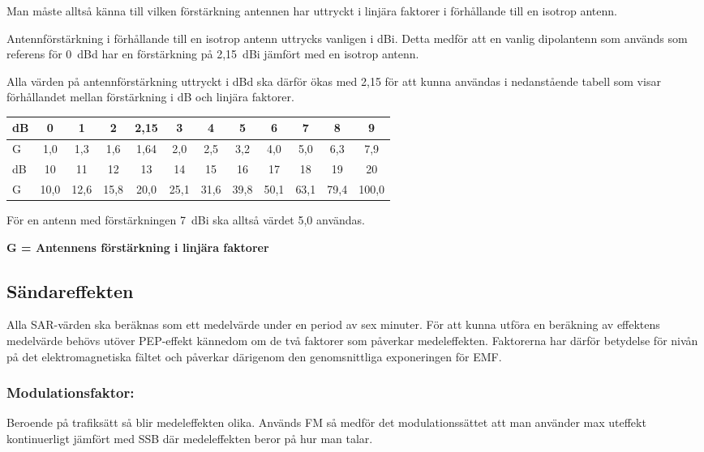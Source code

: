 Man måste alltså känna till vilken förstärkning antennen har uttryckt i linjära
faktorer i förhållande till en isotrop antenn.

Antennförstärkning i förhållande till en isotrop antenn uttrycks vanligen i dBi.
Detta medför att en vanlig dipolantenn som används som referens för 0~dBd har
en förstärkning på 2,15~dBi jämfört med en isotrop antenn.

Alla värden på antennförstärkning uttryckt i dBd ska därför ökas med 2,15 för
att kunna användas i nedanstående tabell som visar förhållandet mellan
förstärkning i dB och linjära faktorer.

\begin{tabular}{|l|ccccccccccc|}
	\hline
	dB     &  0  &  1  &  2 & 2,15 &  3  &  4  &  5  &  6  &  7  &  8  &  9  \\ \hline
	G & 1,0 & 1,3 & 1,6 & 1,64 & 2,0 & 2,5 & 3,2 & 4,0 & 5,0 & 6,3 & 7,9 \\ \hline
	dB     &  10  &  11  &  12  &  13  &  14  &  15  &  16  &  17  &  18  &  19  &  20 \\ \hline
	G & 10,0 & 12,6 & 15,8 & 20,0 & 25,1 & 31,6 & 39,8 & 50,1 & 63,1 & 79,4 & 100,0 \\ \hline
\end{tabular}

För en antenn med förstärkningen 7~dBi ska alltså värdet 5,0 användas.

\textbf{G = Antennens förstärkning i linjära faktorer}

\subsection{Sändareffekten}
Alla SAR-värden ska beräknas som ett medelvärde under en period av sex minuter.
För att kunna utföra en beräkning av effektens medelvärde behövs utöver
PEP-effekt kännedom om de två faktorer som påverkar medeleffekten.
Faktorerna har därför betydelse för nivån på det elektromagnetiska fältet och
påverkar därigenom den genomsnittliga exponeringen för EMF.

\subsubsection{Modulationsfaktor:}

Beroende på trafiksätt så blir medeleffekten olika.
Används FM så medför det modulationssättet att man använder max uteffekt
kontinuerligt jämfört med SSB där medeleffekten beror på hur man talar.

